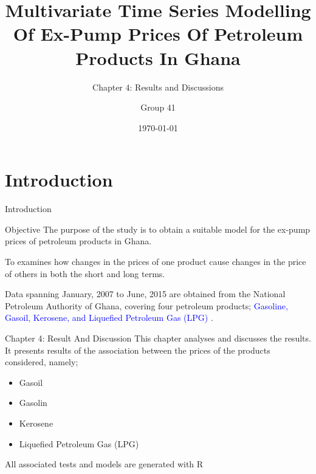 \documentclass{beamer}
\title{Multivariate Time Series Modelling Of Ex-Pump Prices Of Petroleum Products In Ghana}
\subtitle{Chapter 4: Results and Discussions}
\author{Group 41}
\institute{Kwame Nkrumah University of Science and Technology}
\date{\today}
\begin{document}
	\newcommand{\startDate}{January, 2007 }
	\newcommand{\finishDate}{June, 2015 }
	\newcommand{\numOfObservations}{204 }
	
	
	\begin{frame}
		\titlepage
	\end{frame}
	
	\section{Introduction}
	\label{sec:introduction}
	\begin{frame}{Introduction}
		
		\begin{block}{Objective}
			The purpose of the study is to obtain a suitable model for the ex-pump prices of petroleum products in Ghana. 
		\end{block} \vspace{5pt}
		
		 To examines how changes in the prices of one product cause changes in the price of others in both the short and long terms. \par \vspace{5pt}
		
		Data spanning \startDate to \finishDate are obtained from the National Petroleum Authority of Ghana, covering four petroleum products; \textcolor{blue}{Gasoline, Gasoil, Kerosene, and Liquefied Petroleum Gas (LPG) }. 
	\end{frame}

	\begin{frame}{Chapter 4: Result And Discussion}
		This chapter analyses and discusses the results. It presents results of the association between the prices of the products considered, namely; \vspace{5pt}
		
		\begin{itemize}
			\item Gasoil
			\item Gasolin
			\item Kerosene 
			\item Liquefied Petroleum Gas (LPG)
		\end{itemize} \vspace{5pt}
		
		All associated tests and models are generated with R 
	\end{frame}
	
	
\end{document}
